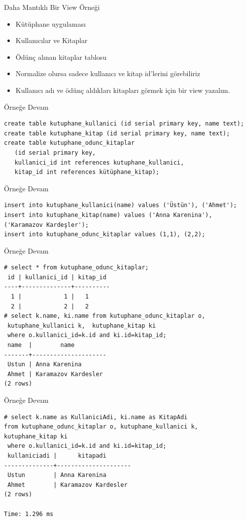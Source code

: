 \documentclass[presentation]{beamer}
\begin{document}
\begin{frame}[label=sec-31]{Daha Mantıklı Bir View Örneği}
\begin{itemize}
\item Kütüphane uygulaması
\item Kullanıcılar ve Kitaplar
\item Ödünç alınan kitaplar tablosu
\item Normalize olursa sadece kullanıcı ve kitap id'lerini görebiliriz
\item Kullanıcı adı ve ödünç aldıkları kitapları görmek için bir view yazalım.
\end{itemize}
\end{frame}

\begin{frame}[fragile,label=sec-32]{Örneğe Devam}
 \begin{verbatim}
create table kutuphane_kullanici (id serial primary key, name text);
create table kutuphane_kitap (id serial primary key, name text);
create table kutuphane_odunc_kitaplar
   (id serial primary key,
   kullanici_id int references kutuphane_kullanici,
   kitap_id int references kütüphane_kitap);
\end{verbatim}
\end{frame}

\begin{frame}[fragile,label=sec-33]{Örneğe Devam}
 \begin{verbatim}
insert into kutuphane_kullanici(name) values ('Üstün'), ('Ahmet');
insert into kutuphane_kitap(name) values ('Anna Karenina'), ('Karamazov Kardeşler');
insert into kutuphane_odunc_kitaplar values (1,1), (2,2);
\end{verbatim}
\end{frame}

\begin{frame}[fragile,label=sec-34]{Örneğe Devam}
 \begin{verbatim}
# select * from kutuphane_odunc_kitaplar;
 id | kullanici_id | kitap_id
----+--------------+----------
  1 |            1 |   1
  2 |            2 |   2
# select k.name, ki.name from kutuphane_odunc_kitaplar o,
 kutuphane_kullanici k,  kutuphane_kitap ki
 where o.kullanici_id=k.id and ki.id=kitap_id;
 name  |        name
-------+---------------------
 Ustun | Anna Karenina
 Ahmet | Karamazov Kardesler
(2 rows)
\end{verbatim}
\end{frame}

\begin{frame}[fragile,label=sec-35]{Örneğe Devam}
 \begin{verbatim}
# select k.name as KullaniciAdi, ki.name as KitapAdi
from kutuphane_odunc_kitaplar o, kutuphane_kullanici k, kutuphane_kitap ki
 where o.kullanici_id=k.id and ki.id=kitap_id;
 kullaniciadi |      kitapadi
--------------+---------------------
 Ustun        | Anna Karenina
 Ahmet        | Karamazov Kardesler
(2 rows)

Time: 1.296 ms
\end{verbatim}
\end{frame}
\end{document}
